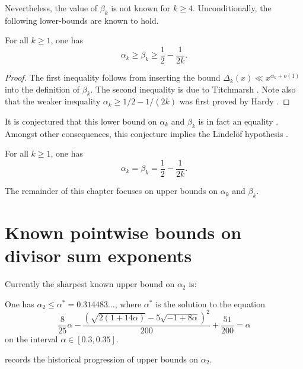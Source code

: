 Nevertheless, the value of $\beta_k$ is not known for $k \ge 4$. Unconditionally, the following lower-bounds are known to hold. 

\begin{lemma}\label{divisor-lower}
For all $k \geq 1$, one has
\[
\alpha_k \geq \beta_k \geq \frac{1}{2} - \frac{1}{2k}.
\]
\end{lemma}
\begin{proof}The first inequality follows from inserting the bound $\Delta_k(x) \ll x^{\alpha_k + o(1)}$ into the definition of $\beta_k$. The second inequality is due to Titchmarsh \cite{titchmarsh_divisor_1938}. Note also that the weaker inequality $\alpha_k \ge 1/2 - 1/(2k)$ was first proved by Hardy \cite{hardy_divisor_1916}.
\end{proof}

It is conjectured that this lower bound on $\alpha_k$ and $\beta_k$ is in fact an equality \cite[p.\ 320]{titchmarsh_theory_1986}. Amongst other consequences, this conjecture implies the Lindel\"of hypothesis \cite[Chapter XII]{titchmarsh_theory_1986}.  
\begin{conjecture}
For all $k \geq 1$, one has
\[
\alpha_k = \beta_k = \frac{1}{2} - \frac{1}{2k}.
\]
\end{conjecture}

The remainder of this chapter focuses on upper bounds on $\alpha_k$ and $\beta_k$. 

\section{Known pointwise bounds on divisor sum exponents}

Currently the sharpest known upper bound on $\alpha_2$ is:

\begin{theorem}\label{divisor-2-bound}\cite[Theorem 1.2]{li_yang_gauss_2024} One has $\alpha_2 \leq \alpha^* = 0.314483\ldots$, where $\alpha^*$ is the solution to the equation
\[
\frac{8}{25}\alpha - \frac{(\sqrt{2(1+14\alpha)} - 5\sqrt{-1+8\alpha})^2}{200} + \frac{51}{200} = \alpha
\]
on the interval $\alpha \in [0.3, 0.35]$.
\end{theorem}

 records the historical progression of upper bounds on $\alpha_2$.

